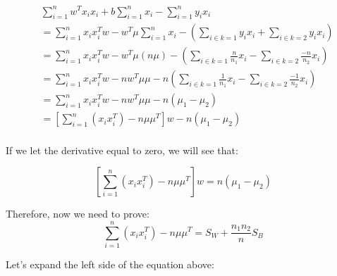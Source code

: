 \documentclass[10pt]{article}
\begin{document}
\begin{equation}
    \begin{aligned}
        &\sum_{i=1}^n w^Tx_ix_i + b \sum_{i=1}^nx_i - \sum_{i=1}^n y_ix_i \\
        &= \sum_{i=1}^n x_ix_i^Tw - w^T\mu \sum_{i=1}^nx_i - \left(\sum_{i \in k=1} y_ix_i +  \sum_{i \in k=2} y_ix_i \right) \\
        &= \sum_{i=1}^n x_ix_i^Tw - w^T\mu \left(n\mu\right) - \left(\sum_{i \in k=1} \frac{n}{n_1}x_i -  \sum_{i \in k=2} \frac{-n}{n_2}x_i \right) \\
        &= \sum_{i=1}^n x_ix_i^Tw - nw^T\mu\mu - n\left(\sum_{i \in k=1} \frac{1}{n_1}x_i -  \sum_{i \in k=2} \frac{-1}{n_2}x_i \right) \\
        &= \sum_{i=1}^n x_ix_i^Tw - nw^T\mu\mu - n\left(\mu_1 - \mu_2\right) \\
        &= \left[\sum_{i=1}^n \left(x_ix_i^T\right)-n\mu\mu^T\right]w - n\left(\mu_1 - \mu_2\right) \\
    \end{aligned}
\end{equation}

\noindent If we let the derivative equal to zero, we will see that:

\begin{equation}
    \left[\sum_{i=1}^n \left(x_ix_i^T\right)-n\mu\mu^T\right]w = n\left(\mu_1 - \mu_2\right)
\end{equation}

\noindent Therefore, now we need to prove:
\begin{equation}
    \sum_{i=1}^n \left(x_ix_i^T\right)-n\mu\mu^T = S_W + \frac{n_1n_2}{n} S_B
\end{equation}

\noindent Let's expand the left side of the equation above:
\end{document}
